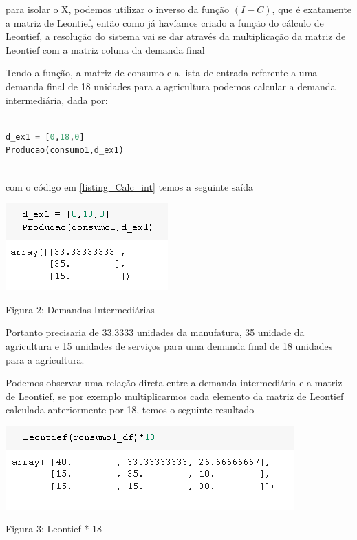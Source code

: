 \documentclass[a4paper, 12pt]{article}
\begin{document}
para isolar o X, podemos utilizar o inverso da função $(I - C)$, que é exatamente a matriz de Leontief, então como já havíamos criado a função do cálculo de Leontief, a resolução do sistema vai se dar através da multiplicação da matriz de Leontief com a matriz coluna da demanda final

Tendo a função, a matriz de consumo e a lista de entrada referente a uma demanda final de 18 unidades para a agricultura podemos calcular a demanda intermediária, dada por:

\begin{lstlisting}[language=Python, caption=Cálculo da Demanda Intermediária, label=listing_Calc_int]

d_ex1 = [0,18,0]
Producao(consumo1,d_ex1)
  
 \end{lstlisting}

com o código em \ref{listing_Calc_int} temos a seguinte saída

\begin{center}
    \includegraphics{saida1c.PNG}
    
    Figura 2: Demandas Intermediárias
    
\end{center}

Portanto precisaria de 33.3333 unidades da manufatura, 35 unidade da agricultura e 15 unidades de serviços para uma demanda final de 18 unidades para a agricultura.

Podemos observar uma relação direta entre a demanda intermediária e a matriz de Leontief, se por exemplo multiplicarmos cada elemento da matriz de Leontief calculada anteriormente por 18, temos o seguinte resultado

\begin{center}
    \includegraphics{saida1c_2.PNG}
    
    Figura 3: Leontief * 18
    
\end{center}
\end{document}
